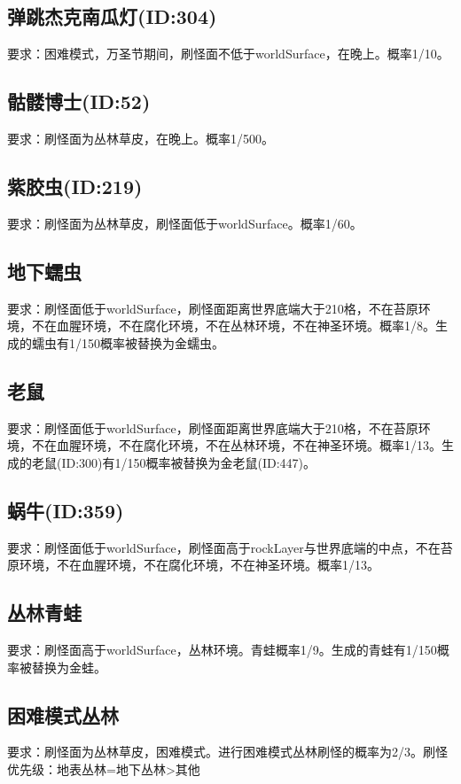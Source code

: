 \subsection{弹跳杰克南瓜灯(ID:304)}
要求：困难模式，万圣节期间，刷怪面不低于worldSurface，在晚上。概率1/10。

\subsection{骷髅博士(ID:52)}
要求：刷怪面为丛林草皮，在晚上。概率1/500。

\subsection{紫胶虫(ID:219)}
要求：刷怪面为丛林草皮，刷怪面低于worldSurface。概率1/60。

\subsection{地下蠕虫}
要求：刷怪面低于worldSurface，刷怪面距离世界底端大于210格，不在苔原环境，不在血腥环境，不在腐化环境，不在丛林环境，不在神圣环境。概率1/8。生成的蠕虫有1/150概率被替换为金蠕虫。

\subsection{老鼠}
要求：刷怪面低于worldSurface，刷怪面距离世界底端大于210格，不在苔原环境，不在血腥环境，不在腐化环境，不在丛林环境，不在神圣环境。概率1/13。生成的老鼠(ID:300)有1/150概率被替换为金老鼠(ID:447)。

\subsection{蜗牛(ID:359)}
要求：刷怪面低于worldSurface，刷怪面高于rockLayer与世界底端的中点，不在苔原环境，不在血腥环境，不在腐化环境，不在神圣环境。概率1/13。

\subsection{丛林青蛙}
要求：刷怪面高于worldSurface，丛林环境。青蛙概率1/9。生成的青蛙有1/150概率被替换为金蛙。

\subsection{困难模式丛林}
要求：刷怪面为丛林草皮，困难模式。进行困难模式丛林刷怪的概率为2/3。刷怪优先级：地表丛林=地下丛林>其他

